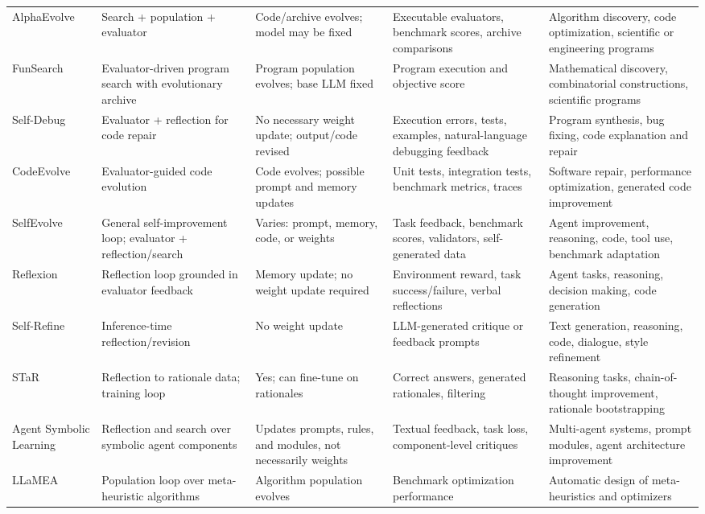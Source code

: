 {\begin{longtable}{@{}L{0.15\textwidth}L{0.20\textwidth}L{0.14\textwidth}L{0.23\textwidth}L{0.19\textwidth}@{}}
AlphaEvolve & Search + population + evaluator & Code/archive evolves; model may be fixed & Executable evaluators, benchmark scores, archive comparisons & Algorithm discovery, code optimization, scientific or engineering programs \\
FunSearch & Evaluator-driven program search with evolutionary archive & Program population evolves; base LLM fixed & Program execution and objective score & Mathematical discovery, combinatorial constructions, scientific programs \\
Self-Debug & Evaluator + reflection for code repair & No necessary weight update; output/code revised & Execution errors, tests, examples, natural-language debugging feedback & Program synthesis, bug fixing, code explanation and repair \\
CodeEvolve & Evaluator-guided code evolution & Code evolves; possible prompt and memory updates & Unit tests, integration tests, benchmark metrics, traces & Software repair, performance optimization, generated code improvement \\
SelfEvolve & General self-improvement loop; evaluator + reflection/search & Varies: prompt, memory, code, or weights & Task feedback, benchmark scores, validators, self-generated data & Agent improvement, reasoning, code, tool use, benchmark adaptation \\
Reflexion & Reflection loop grounded in evaluator feedback & Memory update; no weight update required & Environment reward, task success/failure, verbal reflections & Agent tasks, reasoning, decision making, code generation \\
Self-Refine & Inference-time reflection/revision & No weight update & LLM-generated critique or feedback prompts & Text generation, reasoning, code, dialogue, style refinement \\
STaR & Reflection to rationale data; training loop & Yes; can fine-tune on rationales & Correct answers, generated rationales, filtering & Reasoning tasks, chain-of-thought improvement, rationale bootstrapping \\
Agent Symbolic Learning & Reflection and search over symbolic agent components & Updates prompts, rules, and modules, not necessarily weights & Textual feedback, task loss, component-level critiques & Multi-agent systems, prompt modules, agent architecture improvement \\
LLaMEA & Population loop over meta-heuristic algorithms & Algorithm population evolves & Benchmark optimization performance & Automatic design of meta-heuristics and optimizers \\

\end{longtable}}
